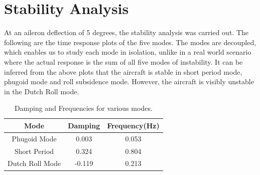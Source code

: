 \section{Stability Analysis}
At an aileron deflection of 5 degrees, the stability analysis was carried out.
The following are the time response plots of the five modes. The modes are decoupled, which enables us to study each mode in isolation, unlike in a real world scenario where the actual response is the sum of all five modes of instability.
It can be inferred from the above plots that the aircraft is stable in short period mode, phugoid mode and roll subsidence mode. However, the aircraft is visibly unstable in the Dutch Roll mode.

\begin{table}[H]
\begin{center}
\begin{tabular}{ |c| c| c| }
\hline
 Mode & Damping & Frequency(Hz) \\ 
 \hline
 Phugoid Mode & 0.003 & 0.053 \\ 
 \hline
 Short Period & 0.324 & 0.804 \\ 
 \hline
 Dutch Roll Mode & -0.119 & 0.213 \\
 \hline
\end{tabular}
\end{center}
\caption{Damping and Frequencies for various modes.}
\end{table}

